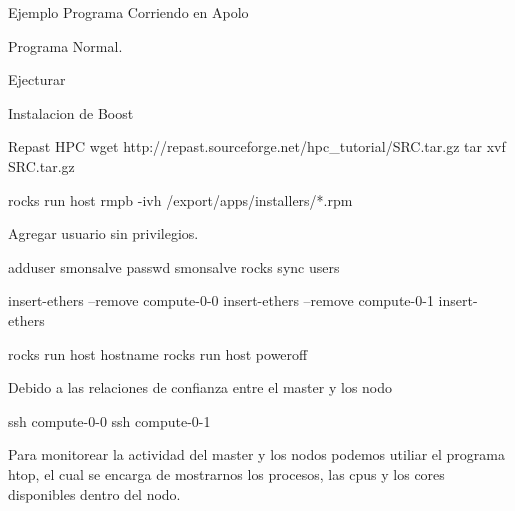 Ejemplo Programa Corriendo en Apolo

Programa Normal. 

Ejecturar


Instalacion de Boost


Repast HPC
wget http://repast.sourceforge.net/hpc_tutorial/SRC.tar.gz
tar xvf SRC.tar.gz

rocks run host rmpb -ivh /export/apps/installers/*.rpm


Agregar usuario sin privilegios. 

adduser smonsalve
passwd smonsalve
rocks sync users


insert-ethers --remove compute-0-0
insert-ethers --remove compute-0-1
insert-ethers 

rocks run host hostname
rocks run host poweroff



Debido a las relaciones de confianza entre el master y los nodo


ssh compute-0-0
ssh compute-0-1


Para monitorear la actividad del master y los nodos podemos utiliar el programa htop, el cual se encarga de mostrarnos los procesos, las cpus y los cores disponibles dentro del nodo. 

